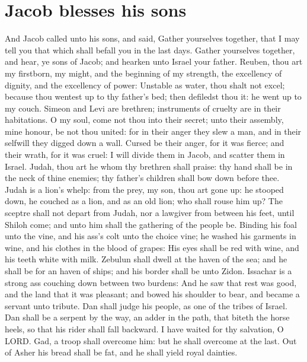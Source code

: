 \section*{Jacob blesses his sons}
\begin{biblechapter} %
\verse And Jacob called unto his sons, and said, Gather yourselves together, that I may tell you that which shall befall you in the last days.
\verse Gather yourselves together, and hear, ye sons of Jacob; and hearken unto Israel your father.
\verse Reuben, thou art my firstborn, my might, and the beginning of my strength, the excellency of dignity, and the excellency of power:
\verse Unstable as water, thou shalt not excel; because thou wentest up to thy father's bed; then defiledst thou it: he went up to my couch.
\verse Simeon and Levi are brethren; instruments of cruelty are in their habitations.
\verse O my soul, come not thou into their secret; unto their assembly, mine honour, be not thou united: for in their anger they slew a man, and in their selfwill they digged down a wall.
\verse Cursed be their anger, for it was fierce; and their wrath, for it was cruel: I will divide them in Jacob, and scatter them in Israel.
\verse Judah, thou art he whom thy brethren shall praise: thy hand shall be in the neck of thine enemies; thy father's children shall bow down before thee.
\verse Judah is a lion's whelp: from the prey, my son, thou art gone up: he stooped down, he couched as a lion, and as an old lion; who shall rouse him up?
\verse The sceptre shall not depart from Judah, nor a lawgiver from between his feet, until Shiloh come; and unto him shall the gathering of the people be.
\verse Binding his foal unto the vine, and his ass's colt unto the choice vine; he washed his garments in wine, and his clothes in the blood of grapes:
\verse His eyes shall be red with wine, and his teeth white with milk.
\verse Zebulun shall dwell at the haven of the sea; and he shall be for an haven of ships; and his border shall be unto Zidon.
\verse Issachar is a strong ass couching down between two burdens:
\verse And he saw that rest was good, and the land that it was pleasant; and bowed his shoulder to bear, and became a servant unto tribute.
\verse Dan shall judge his people, as one of the tribes of Israel.
\verse Dan shall be a serpent by the way, an adder in the path, that biteth the horse heels, so that his rider shall fall backward.
\verse I have waited for thy salvation, O LORD.
\verse Gad, a troop shall overcome him: but he shall overcome at the last.
\verse Out of Asher his bread shall be fat, and he shall yield royal dainties.

\end{biblechapter}
